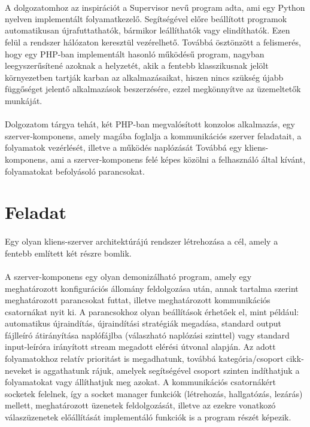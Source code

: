 \documentclass[12pt]{report}
\begin{document}
\paragraph{}
A dolgozatomhoz az inspirációt a Supervisor\textsuperscript{\cite{supervisor}} nevű program adta, ami egy Python nyelven implementált folyamatkezelő. Segítségével előre beállított programok automatikusan újrafuttathatók, bármikor leállíthatók vagy elindíthatók. Ezen felül a rendszer hálózaton keresztül vezérelhető.
Továbbá ösztönzött a felismerés, hogy egy PHP-ban implementált hasonló működésű program, nagyban leegyszerűsítené azoknak a helyzetét, akik a fentebb klasszikusnak jelölt környezetben tartják karban az alkalmazásaikat, hiszen nincs szükség újabb függőséget jelentő alkalmazások beszerzésére, ezzel megkönnyítve az üzemeltetők munkáját.

\paragraph{}
Dolgozatom tárgya tehát, két PHP-ban megvalósított konzolos alkalmazás, egy szerver-komponens, amely magába foglalja a kommunikációs szerver feladatait, a folyamatok vezérlését, illetve a működés naplózását Továbbá egy kliens-komponens, ami a szerver-komponens  felé képes közölni a felhasználó által kívánt, folyamatokat befolyásoló parancsokat.

\section{Feladat}\label{par:feladat}
\paragraph{}
Egy olyan kliens-szerver architektúrájú rendszer létrehozása a cél, amely a fentebb említett két részre bomlik. 
\paragraph{}
A szerver-komponens egy olyan demonizálható program, amely egy meghatározott konfigurációs állomány feldolgozása után, annak tartalma szerint meghatározott parancsokat futtat, illetve meghatározott kommunikációs csatornákat nyit ki. A parancsokhoz olyan beállítások érhetőek el, mint például: automatikus újraindítás, újraindítási stratégiák megadása, standard output fájlleíró átirányítása naplófájlba (válaszható naplózási szinttel) vagy standard input-leíróra irányított stream megadott elérési útvonal alapján. Az adott folyamatokhoz relatív prioritást is megadhatunk, továbbá kategória/csoport cikk-neveket is aggathatunk rájuk, amelyek segítségével csoport szinten indíthatjuk a folyamatokat vagy állíthatjuk meg azokat. A kommunikációs csatornákért socketek felelnek, így a socket manager funkciók (létrehozás, hallgatózás, lezárás) mellett, meghatározott üzenetek feldolgozását, illetve az ezekre vonatkozó válaszüzenetek előállítását implementáló funkciók is a program részét képezik.
\end{document}
